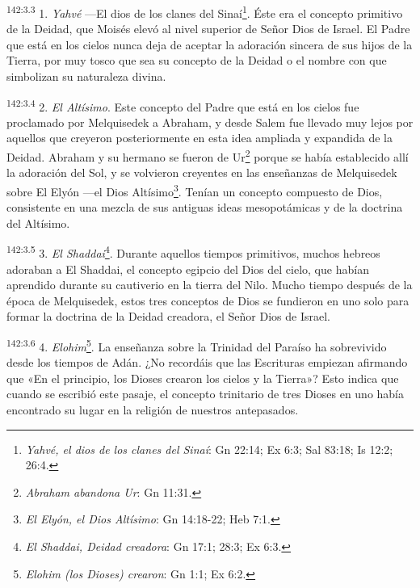 \par 
\textsuperscript{142:3.3} 1. \textit{Yahvé} ---El dios de los clanes del Sinaí\footnote{\textit{Yahvé, el dios de los clanes del Sinaí}: Gn 22:14; Ex 6:3; Sal 83:18; Is 12:2; 26:4.}. Éste era el concepto primitivo de la Deidad, que Moisés elevó al nivel superior de Señor Dios de Israel. El Padre que está en los cielos nunca deja de aceptar la adoración sincera de sus hijos de la Tierra, por muy tosco que sea su concepto de la Deidad o el nombre con que simbolizan su naturaleza divina.

\par 
\textsuperscript{142:3.4} 2. \textit{El Altísimo}. Este concepto del Padre que está en los cielos fue proclamado por Melquisedek a Abraham, y desde Salem fue llevado muy lejos por aquellos que creyeron posteriormente en esta idea ampliada y expandida de la Deidad. Abraham y su hermano se fueron de Ur\footnote{\textit{Abraham abandona Ur}: Gn 11:31.} porque se había establecido allí la adoración del Sol, y se volvieron creyentes en las enseñanzas de Melquisedek sobre El Elyón ---el Dios Altísimo\footnote{\textit{El Elyón, el Dios Altísimo}: Gn 14:18-22; Heb 7:1.}. Tenían un concepto compuesto de Dios, consistente en una mezcla de sus antiguas ideas mesopotámicas y de la doctrina del Altísimo.

\par 
\textsuperscript{142:3.5} 3. \textit{El Shaddai}\footnote{\textit{El Shaddai, Deidad creadora}: Gn 17:1; 28:3; Ex 6:3.}. Durante aquellos tiempos primitivos, muchos hebreos adoraban a El Shaddai, el concepto egipcio del Dios del cielo, que habían aprendido durante su cautiverio en la tierra del Nilo. Mucho tiempo después de la época de Melquisedek, estos tres conceptos de Dios se fundieron en uno solo para formar la doctrina de la Deidad creadora, el Señor Dios de Israel.

\par 
\textsuperscript{142:3.6} 4. \textit{Elohim}\footnote{\textit{Elohim (los Dioses) crearon}: Gn 1:1; Ex 6:2.}. La enseñanza sobre la Trinidad del Paraíso ha sobrevivido desde los tiempos de Adán. ¿No recordáis que las Escrituras empiezan afirmando que «En el principio, los Dioses crearon los cielos y la Tierra»? Esto indica que cuando se escribió este pasaje, el concepto trinitario de tres Dioses en uno había encontrado su lugar en la religión de nuestros antepasados.

